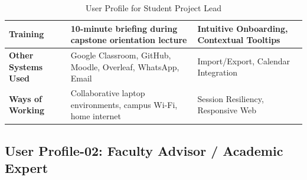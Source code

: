 \begin{table}[H]
\begin{tabularx}{\textwidth}{|l|X|p{4.2cm}|}
\textbf{Training} & 10-minute briefing during capstone orientation lecture & Intuitive Onboarding, Contextual Tooltips \\ \hline
\textbf{Other Systems Used} & Google Classroom, GitHub, Moodle, Overleaf, WhatsApp, Email & Import/Export, Calendar Integration \\ \hline
\textbf{Ways of Working} & Collaborative laptop environments, campus Wi-Fi, home internet & Session Resiliency, Responsive Web \\ \hline
\end{tabularx}
\caption{User Profile for Student Project Lead}
\label{tab:user_profile_student}
\end{table}

\subsection{User Profile-02: Faculty Advisor / Academic Expert}
\label{subsec:profile_faculty}


